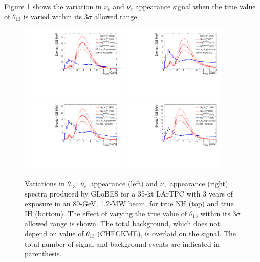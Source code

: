 \documentclass[letterpaper,11pt]{article}
\begin{document}
Figure \ref{fig:th13spec} shows the variation in $\nu_e$ and $\overline{\nu}_e$
appearance signal when the true value of $\theta_{13}$ is varied within its 3$\sigma$
allowed range. 
\begin{figure}[!htb]
  \centering
  \includegraphics[width=0.45\textwidth]{figs/spectra_35kt_nue_th13var_nh.pdf}
  \includegraphics[width=0.45\textwidth]{figs/spectra_35kt_nuebar_th13var_nh.pdf}
  \includegraphics[width=0.45\textwidth]{figs/spectra_35kt_nue_th13var_ih.pdf}
  \includegraphics[width=0.45\textwidth]{figs/spectra_35kt_nuebar_th13var_ih.pdf}
  \caption{
  Variations in $\theta_{13}$: 
  $\nu_e$~appearance (left) and $\overline{\nu}_e$~appearance (right) spectra 
  produced by GLoBES for a 35-kt LArTPC with 3 years of 
  exposure in an 80-GeV, 1.2-MW beam,  for true NH (top) and true IH (bottom). 
  The effect of varying the true
  value of $\theta_{13}$ within its 3$\sigma$ allowed range is shown. 
  The total background, which does not depend on value of $\theta_{13}$ (CHECKME), 
  is overlaid on the signal. The total number
  of signal and background events are indicated in parenthesis.}
  \label{fig:th13spec}
\end{figure}
\end{document}
